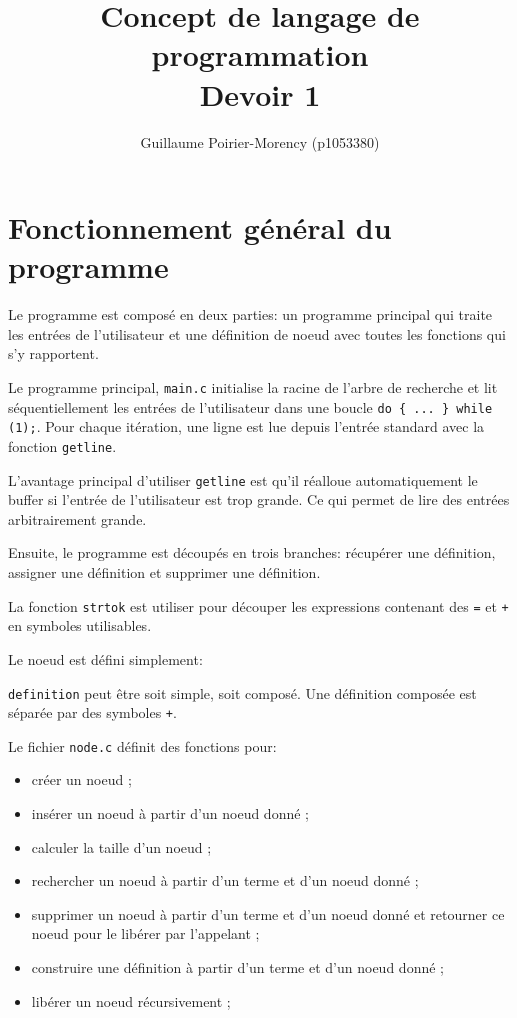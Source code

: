 \documentclass{article}
\title{Concept de langage de programmation \\ Devoir 1}
\author{Guillaume Poirier-Morency (p1053380)}
\begin{document}
\maketitle

\section{Fonctionnement général du programme}
Le programme est composé en deux parties: un programme principal qui traite les
entrées de l'utilisateur et une définition de noeud avec toutes les fonctions
qui s'y rapportent.

Le programme principal, \texttt{main.c} initialise la racine de l'arbre de
recherche et lit séquentiellement les entrées de l'utilisateur dans une boucle
\texttt{do \{ ... \} while (1);}. Pour chaque itération, une ligne est lue
depuis l'entrée standard avec la fonction \texttt{getline}.

L'avantage principal d'utiliser \texttt{getline} est qu'il réalloue
automatiquement le buffer si l'entrée de l'utilisateur est trop grande. Ce qui
permet de lire des entrées arbitrairement grande.

Ensuite, le programme est découpés en trois branches: récupérer une définition,
assigner une définition et supprimer une définition.

La fonction \texttt{strtok} est utiliser pour découper les expressions contenant
des \texttt{=} et \texttt{+} en symboles utilisables.

Le noeud est défini simplement:


\texttt{definition} peut être soit simple, soit composé. Une définition composée
est séparée par des symboles \texttt{+}.

Le fichier \texttt{node.c} définit des fonctions pour:
\begin{itemize}
\item créer un noeud ;
\item insérer un noeud à partir d'un noeud donné ;
\item calculer la taille d'un noeud ;
\item rechercher un noeud à partir d'un terme et d'un noeud donné ;
\item supprimer un noeud à partir d'un terme et d'un noeud donné et retourner ce
noeud pour le libérer par l'appelant ;
\item construire une définition à partir d'un terme et d'un noeud donné ;
\item libérer un noeud récursivement ;
\end{itemize}
\end{document}
